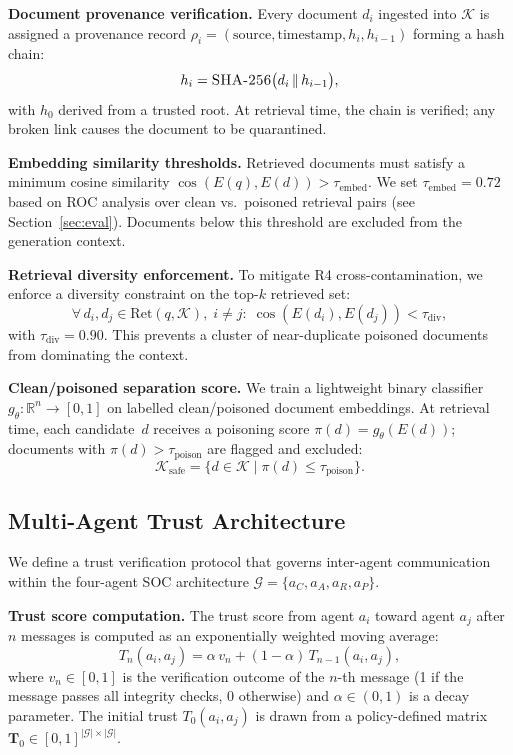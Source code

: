 \textbf{Document provenance verification.}
Every document $d_i$ ingested into $\mathcal{K}$ is assigned a
provenance record
$\rho_i = (\text{source}, \text{timestamp}, h_i, h_{i-1})$
forming a hash chain:
\begin{equation}
  h_i = \textsc{SHA-256}\bigl(d_i \,\|\, h_{i-1}\bigr),
  \label{eq:hashchain}
\end{equation}
with $h_0$ derived from a trusted root.  At retrieval time, the chain
is verified; any broken link causes the document to be quarantined.

\textbf{Embedding similarity thresholds.}
Retrieved documents must satisfy a minimum cosine similarity
$\cos(E(q), E(d)) > \tau_{\text{embed}}$.  We set
$\tau_{\text{embed}} = 0.72$ based on ROC analysis over
clean vs.\ poisoned retrieval pairs (see Section~\ref{sec:eval}).
Documents below this threshold are excluded from the generation context.

\textbf{Retrieval diversity enforcement.}
To mitigate R4 cross-contamination, we enforce a diversity constraint
on the top-$k$ retrieved set:
\begin{equation}
  \forall\, d_i, d_j \in \text{Ret}(q, \mathcal{K}),\;
  i \neq j\!:\; \cos(E(d_i), E(d_j)) < \tau_{\text{div}},
  \label{eq:diversity}
\end{equation}
with $\tau_{\text{div}} = 0.90$.  This prevents a cluster of
near-duplicate poisoned documents from dominating the context.

\textbf{Clean/poisoned separation score.}
We train a lightweight binary classifier
$g_{\theta}\!: \mathbb{R}^{n} \to [0,1]$ on labelled
clean/poisoned document embeddings.  At retrieval time, each
candidate~$d$ receives a poisoning score
$\pi(d) = g_{\theta}(E(d))$; documents with
$\pi(d) > \tau_{\text{poison}}$ are flagged and excluded:
\begin{equation}
  \mathcal{K}_{\text{safe}} = \{d \in \mathcal{K} \mid \pi(d) \le \tau_{\text{poison}}\}.
\end{equation}

\subsection{Multi-Agent Trust Architecture}
\label{sec:defense:trust}

We define a trust verification protocol that governs inter-agent
communication within the four-agent SOC architecture
$\mathcal{G} = \{a_C, a_A, a_R, a_P\}$.

\textbf{Trust score computation.}
The trust score from agent $a_i$ toward agent $a_j$ after $n$
messages is computed as an exponentially weighted moving average:
\begin{equation}
  T_n(a_i, a_j) = \alpha\, v_n + (1 - \alpha)\, T_{n-1}(a_i, a_j),
  \label{eq:trust}
\end{equation}
where $v_n \in [0,1]$ is the verification outcome of the $n$-th
message (1 if the message passes all integrity checks, 0 otherwise)
and $\alpha \in (0,1)$ is a decay parameter.  The initial trust
$T_0(a_i, a_j)$ is drawn from a policy-defined matrix
$\mathbf{T}_0 \in [0,1]^{|\mathcal{G}| \times |\mathcal{G}|}$.

